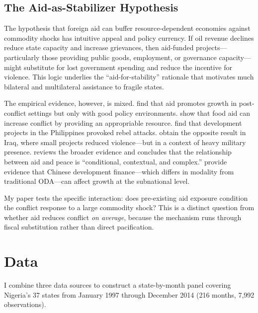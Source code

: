 \documentclass[12pt]{article}
\begin{document}
\subsection{The Aid-as-Stabilizer Hypothesis}

The hypothesis that foreign aid can buffer resource-dependent economies against commodity shocks has intuitive appeal and policy currency. If oil revenue declines reduce state capacity and increase grievances, then aid-funded projects---particularly those providing public goods, employment, or governance capacity---might substitute for lost government spending and reduce the incentive for violence. This logic underlies the ``aid-for-stability'' rationale that motivates much bilateral and multilateral assistance to fragile states.

The empirical evidence, however, is mixed. \citet{collier2004aid} find that aid promotes growth in post-conflict settings but only with good policy environments. \citet{nunn2014us} show that food aid can increase conflict by providing an appropriable resource. \citet{crost2014aid} find that development projects in the Philippines provoked rebel attacks. \citet{berman2011can} obtain the opposite result in Iraq, where small projects reduced violence---but in a context of heavy military presence. \citet{finding2015aid} reviews the broader evidence and concludes that the relationship between aid and peace is ``conditional, contextual, and complex.'' \citet{dreher2021aid} provide evidence that Chinese development finance---which differs in modality from traditional ODA---can affect growth at the subnational level.

My paper tests the specific interaction: does pre-existing aid exposure condition the conflict response to a large commodity shock? This is a distinct question from whether aid reduces conflict \emph{on average}, because the mechanism runs through fiscal substitution rather than direct pacification.


\section{Data}
\label{sec:data}

I combine three data sources to construct a state-by-month panel covering Nigeria's 37 states from January 1997 through December 2014 (216 months, 7,992 observations).
\end{document}
